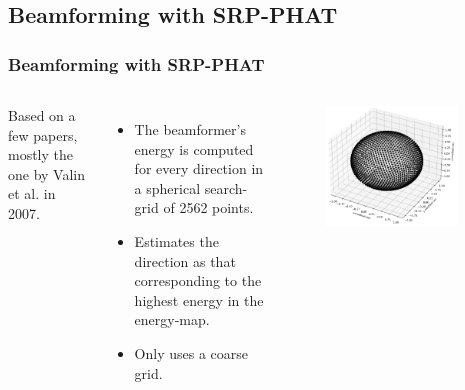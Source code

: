 \documentclass{beamer}
\begin{document}
\subsection{Beamforming with SRP-PHAT}

\begin{frame}
\frametitle{Beamforming with SRP-PHAT}

\begin{columns}

Based on a few papers, mostly the one by Valin et al. in 2007.
\begin{itemize}
	\item The beamformer's energy is computed for every direction in a spherical search-grid of 2562 points.
	\item Estimates the direction as that corresponding to the highest energy in the energy-map.
	\item Only uses a coarse grid.
\end{itemize}

\begin{figure}[H]
\includegraphics[width=0.9\textwidth]{../Python/srp_phat/grid_tight.png}
\centering
\end{figure}

\end{columns}

\end{frame}
\end{document}
